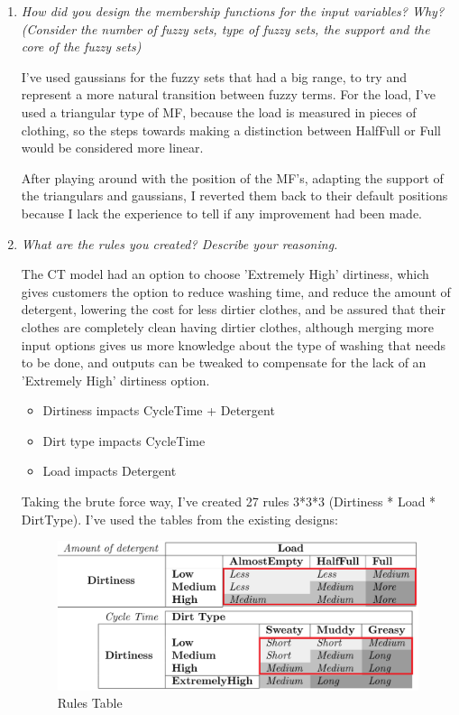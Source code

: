 \documentclass[11pt]{article}
\begin{document}
\begin{enumerate}[label=(\alph*)]
  \item \textit{How did you design the membership functions for the input
  variables? Why? (Consider the number of fuzzy sets, type of fuzzy sets, the
  support and the core of the fuzzy sets)}

  I've used gaussians for the fuzzy sets that had a big range, to try and
  represent a more natural transition between fuzzy terms. For the load, I've
  used a triangular type of MF, because the load is measured in pieces of
  clothing, so the steps towards making a distinction between HalfFull or Full
  would be considered more linear.

  After playing around with the position of the MF's, adapting the support of
  the triangulars and gaussians, I reverted them back to their default
  positions because I lack the experience to tell if any improvement had been
  made.

  \pagebreak

  \item \textit{What are the rules you created? Describe your reasoning.}

  The CT model had an option to choose 'Extremely High' dirtiness,
  which gives customers the option to reduce washing time, and reduce the amount
  of detergent, lowering the cost for less dirtier clothes, and be assured that
  their clothes are completely clean having dirtier clothes, although merging
  more input options gives us more knowledge about the type of washing that
  needs to be done, and outputs can be tweaked to compensate for the lack of an
  'Extremely High' dirtiness option.

  \begin{itemize}[noitemsep]
  \item Dirtiness impacts CycleTime + Detergent
  \item Dirt type impacts CycleTime
  \item Load impacts Detergent
  \end{itemize}

  Taking the brute force way, I've created 27 rules 3*3*3 (Dirtiness * Load *
  DirtType). I've used the tables from the existing designs:

  \begin{figure}[ht!]
    \centering
    \includegraphics[width=0.9\linewidth]{res/rules_table}
    \caption{Rules Table}
  \end{figure}


\end{enumerate}
\end{document}
